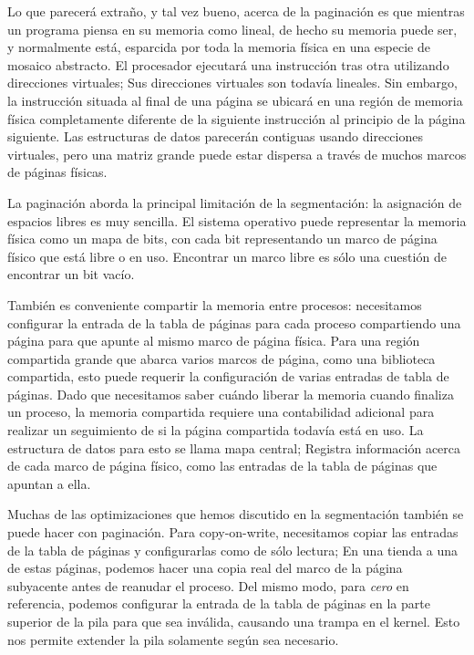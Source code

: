 \documentclass[10pt]{book}
\begin{document}
Lo que parecerá extraño, y tal vez bueno, acerca de la paginación es que mientras un programa piensa en su memoria como lineal, de hecho su memoria puede ser, y normalmente está, esparcida por toda la memoria física en una especie de mosaico abstracto. El procesador ejecutará una instrucción tras otra utilizando direcciones virtuales; Sus direcciones virtuales son todavía lineales. Sin embargo, la instrucción situada al final de una página se ubicará en una región de memoria física completamente diferente de la siguiente instrucción al principio de la página siguiente. Las estructuras de datos parecerán contiguas usando direcciones virtuales, pero una matriz grande puede estar dispersa a través de muchos marcos de páginas físicas.

La paginación aborda la principal limitación de la segmentación: la asignación de espacios libres es muy sencilla. El sistema operativo puede representar la memoria física como un mapa de bits, con cada bit representando un marco de página físico que está libre o en uso. Encontrar un marco libre es sólo una cuestión de encontrar un bit vacío.

También es conveniente compartir la memoria entre procesos: necesitamos configurar la entrada de la tabla de páginas para cada proceso compartiendo una página para que apunte al mismo marco de página física. Para una región compartida grande que abarca varios marcos de página, como una biblioteca compartida, esto puede requerir la configuración de varias entradas de tabla de páginas. Dado que necesitamos saber cuándo liberar la memoria cuando finaliza un proceso, la memoria compartida requiere una contabilidad adicional para realizar un seguimiento de si la página compartida todavía está en uso. La estructura de datos para esto se llama mapa central; Registra información acerca de cada marco de página físico, como las entradas de la tabla de páginas que apuntan a ella.

Muchas de las optimizaciones que hemos discutido en la segmentación también se puede hacer con paginación. Para copy-on-write, necesitamos copiar las entradas de la tabla de páginas y configurarlas como de sólo lectura; En una tienda a una de estas páginas, podemos hacer una copia real del marco de la página subyacente antes de reanudar el proceso. Del mismo modo, para \textit{cero} en referencia, podemos configurar la entrada de la tabla de páginas en la parte superior de la pila para que sea inválida, causando una trampa en el kernel. Esto nos permite extender la pila solamente según sea necesario.
\end{document}
